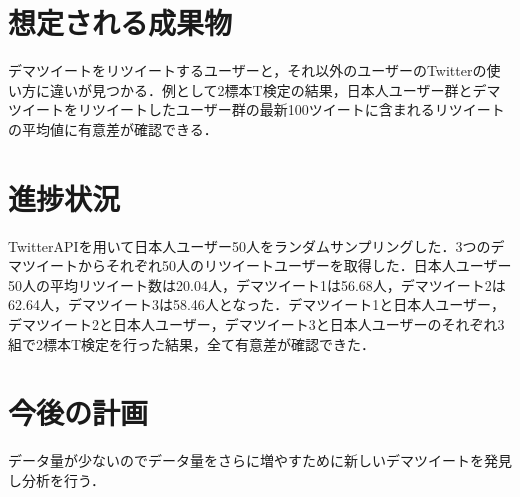 \documentclass[uplatex,twocolumn,dvipdfmx]{jsarticle}
\begin{document}
\section{想定される成果物}
デマツイートをリツイートするユーザーと，それ以外のユーザーのTwitterの使い方に違いが見つかる．例として2標本T検定の結果，日本人ユーザー群とデマツイートをリツイートしたユーザー群の最新100ツイートに含まれるリツイートの平均値に有意差が確認できる．

\section{進捗状況}
TwitterAPIを用いて日本人ユーザー50人をランダムサンプリングした．3つのデマツイートからそれぞれ50人のリツイートユーザーを取得した．日本人ユーザー50人の平均リツイート数は20.04人，デマツイート1は56.68人，デマツイート2は62.64人，デマツイート3は58.46人となった．デマツイート1と日本人ユーザー，デマツイート2と日本人ユーザー，デマツイート3と日本人ユーザーのそれぞれ3組で2標本T検定を行った結果，全て有意差が確認できた．

\section{今後の計画}
データ量が少ないのでデータ量をさらに増やすために新しいデマツイートを発見し分析を行う．


\end{document}

